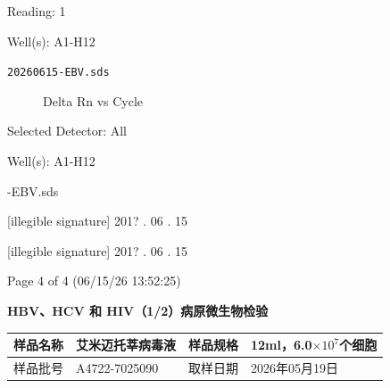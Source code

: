 \documentclass[UTF8,10pt,a4paper,fontset=fandol]{ctexart}
\newcommand{\fieldvalue}[1]{#1}
\newcommand{\handwritten}[1]{#1}
\begin{document}
\vspace{1em}

Reading: 1

Well(s): A1-H12

\vfill

\texttt{20260615-EBV.sds}

\newpage

\begin{figure}[ht]
\centering
\caption{Delta Rn vs Cycle}
\end{figure}

\noindent Selected Detector: All

\noindent Well(s): A1-H12

-EBV.sds

\vfill

\noindent
\handwritten{[illegible signature]}
\hfill
\handwritten{201? . 06 . 15}

\medskip

\noindent
\handwritten{[illegible signature]}
\hfill
\handwritten{201? . 06 . 15}

\noindent\hfill Page 4 of 4 (06/15/26 13:52:25)

\newpage

\begin{center}
\textbf{HBV、HCV 和 HIV（1/2）病原微生物检验}
\end{center}

\begin{tabular}{|p{3.0cm}|p{5.0cm}|p{3.0cm}|p{5.0cm}|}
\hline
样品名称 &
\fieldvalue{艾米迈托莘病毒液} &
样品规格 &
\fieldvalue{12ml，6.0$\times 10^{7}$个细胞}
\\ \hline
样品批号 &
\fieldvalue{\handwritten{A4722-7025090}} &
取样日期 &
\fieldvalue{\handwritten{2026年05月19日}}
\\ \hline
\end{tabular}
\end{document}
